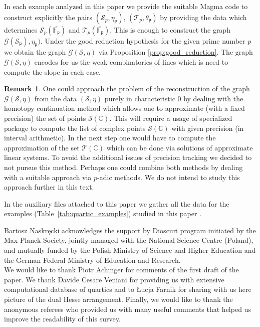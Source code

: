 \documentclass{article}
\theoremstyle{plain}
\theoremstyle{definition}
\newtheorem{remark}[thm]{Remark}
\numberwithin{equation}{section}
\begin{document}
In each example analyzed in this paper we provide the suitable Magma code to construct explicitly the pairs $(\mathcal{S}_{p}, \eta_{\mathfrak{p}})$, $(\mathcal{T}_{p}, \theta_{\mathfrak{p}})$ by providing the data which determines $\mathcal{S}_{p}(\overline{\mathbb{F}_{\mathfrak{p}}})$ and $\mathcal{T}_{p}(\overline{\mathbb{F}_{\mathfrak{p}}})$. This is enough to construct the graph $\mathcal{G}(\mathcal{S}_{\mathfrak{p}}),\eta_{\mathfrak{p}})$. Under the good reduction hypothesis for the given prime number $p$ we obtain the graph $\mathcal{G}(\mathcal{S},\eta)$ via Proposition \ref{prop:good_reduction}. The graph $\mathcal{G}(\mathcal{S},\eta)$ encodes for us the weak combinatorics of lines which is need to compute the slope in each case.


\begin{remark}
One could approach the problem of the reconstruction of the graph $\mathcal{G}(\mathcal{S},\eta)$ from the data $(\mathcal{S},\eta)$ purely in characteristic $0$ by dealing with the homotopy continuation method which allows one to approximate (with a fixed precision) the set of points $\mathcal{S}(\mathbb{C})$. This will require a usage of specialized package to compute the list of complex points $\mathcal{S}(\mathbb{C})$ with given precision (in interval arithmetic). In the next step one would have to compute the approximation of the set $\mathcal{T}(\mathbb{C})$ which can be done via solutions of approximate linear systems. To avoid the additional issues of precision tracking we decided to not pursue this method. 
Perhaps one could combine both methods by dealing with a suitable approach via $p$-adic methods. We do not intend to study this approach further in this text.
\end{remark}

In the auxiliary files attached to this paper we gather all the data for the examples (Table~\ref{tab:quartic_examples}) studied in this paper \cite{auxiliary_files}.


\begin{ack}
Bartosz Naskr\k{e}cki acknowledges the support by Dioscuri program initiated by the Max Planck Society, jointly managed with the National Science Centre (Poland), and mutually funded by the Polish Ministry of Science and Higher Education and the German Federal Ministry of Education and Research.\\
We would like to thank Piotr Achinger for comments of the first draft of the paper. We thank Davide Cesare Veniani for providing us with extensive computational database of quartics and to \L ucja Farnik for sharing with us here picture of the dual Hesse arrangement. Finally, we would like to thank the anonymous referees who provided us with many useful comments that helped us improve the readability of this survey.
\end{ack}
\end{document}
